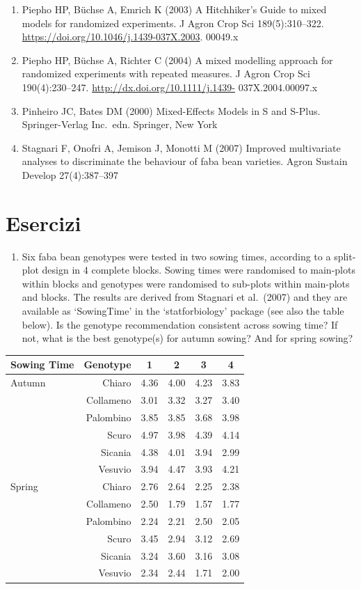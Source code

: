 \documentclass[
  12pt,
]{book}
\providecommand{\tightlist}{%
  \setlength{\itemsep}{0pt}\setlength{\parskip}{0pt}}
\begin{document}
\begin{enumerate}
\item
  Piepho HP, Büchse A, Emrich K (2003) A Hitchhiker's Guide to mixed models for randomized experiments. J Agron Crop Sci 189(5):310--322. \url{https://doi.org/10.1046/j.1439-037X.2003}. 00049.x
\item
  Piepho HP, Büchse A, Richter C (2004) A mixed modelling approach for randomized experiments with repeated measures. J Agron Crop Sci 190(4):230--247. \url{http://dx.doi.org/10.1111/j.1439-} 037X.2004.00097.x
\item
  Pinheiro JC, Bates DM (2000) Mixed-Effects Models in S and S-Plus. Springer-Verlag Inc.~edn. Springer, New York
\item
  Stagnari F, Onofri A, Jemison J, Monotti M (2007) Improved multivariate analyses to discriminate the behaviour of faba bean varieties. Agron Sustain Develop 27(4):387--397
\end{enumerate}

\hypertarget{esercizi-5}{%
\section{Esercizi}\label{esercizi-5}}

\begin{enumerate}
\def\labelenumi{\arabic{enumi}.}
\tightlist
\item
  Six faba bean genotypes were tested in two sowing times, according to a split-plot design in 4 complete blocks. Sowing times were randomised to main-plots within blocks and genotypes were randomised to sub-plots within main-plots and blocks. The results are derived from Stagnari et al.~(2007) and they are available as `SowingTime' in the `statforbiology' package (see also the table below). Is the genotype recommendation consistent across sowing time? If not, what is the best genotype(s) for autumn sowing? And for spring sowing?
\end{enumerate}

\begin{longtable}[]{@{}lrcccc@{}}
\toprule\noalign{}
Sowing Time & Genotype & 1 & 2 & 3 & 4 \\
\midrule\noalign{}
\endhead
\bottomrule\noalign{}
\endlastfoot
Autumn & Chiaro & 4.36 & 4.00 & 4.23 & 3.83 \\
& Collameno & 3.01 & 3.32 & 3.27 & 3.40 \\
& Palombino & 3.85 & 3.85 & 3.68 & 3.98 \\
& Scuro & 4.97 & 3.98 & 4.39 & 4.14 \\
& Sicania & 4.38 & 4.01 & 3.94 & 2.99 \\
& Vesuvio & 3.94 & 4.47 & 3.93 & 4.21 \\
Spring & Chiaro & 2.76 & 2.64 & 2.25 & 2.38 \\
& Collameno & 2.50 & 1.79 & 1.57 & 1.77 \\
& Palombino & 2.24 & 2.21 & 2.50 & 2.05 \\
& Scuro & 3.45 & 2.94 & 3.12 & 2.69 \\
& Sicania & 3.24 & 3.60 & 3.16 & 3.08 \\
& Vesuvio & 2.34 & 2.44 & 1.71 & 2.00 \\
\end{longtable}
\end{document}
